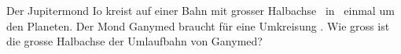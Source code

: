 Der Jupitermond Io kreist auf einer Bahn mit grosser Halbachse \aIoO\ in \TIoO\ einmal um den Planeten. Der Mond Ganymed braucht für eine Umkreisung \TGaO. Wie gross ist die grosse Halbachse der Umlaufbahn von Ganymed?
